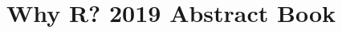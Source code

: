 \usepackage[utf8]{inputenc}

\title{Why R? 2019 Abstract Book}

\usepackage{titling}

\posttitle{\end{center}}

\usepackage{titlesec}

\raggedbottom

